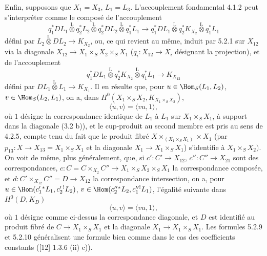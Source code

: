 Enfin, supposons que $X_1=X_3$, $L_1=L_3$. L'accouplement fondamental 4.1.2 peut s'interpréter comme le composé de l'accouplement
\begin{equation}
\tag{5.2.7}
q_1^*DL_1\overset{\mathrm{L}}{\otimes}q_2^*L_2\overset{\mathrm{L}}{\otimes}q_2^*DL_2\overset{\mathrm{L}}{\otimes}q_1^*L_1
\longrightarrow
q_1^*DL_1\overset{\mathrm{L}}{\otimes}q_2^*K_{X_2}\overset{\mathrm{L}}{\otimes}q_1^*L_1
\end{equation}
défini par $L_2\overset{\mathrm{L}}{\otimes}DL_2\to K_{X_2}$, ou, ce qui revient au même, induit par 5.2.1 sur $X_{12}$ via la diagonale $X_{12}\to X_1\times_SX_2\times_SX_1$ ($q_i:X_{12}\to X_i$ désignant la projection), et de l'accouplement
\begin{equation}
\tag{5.2.8}
q_1^*DL_1\overset{\mathrm{L}}{\otimes}q_2^*K_{X_2}\overset{\mathrm{L}}{\otimes}q_1^*L_1\longrightarrow K_{X_{12}}
\end{equation}
défini par $DL_1\overset{\mathrm{L}}{\otimes}L_1\to K_{X_1}$. Il en résulte que, pour $u\in\Hom_S(L_1,L_2)$, $v\in\Hom_S(L_2,L_1)$, on a, dans $H^0(X_1\times_SX_2,K_{X_1\times_SX_2})$,
\begin{equation}
\tag{5.2.9}
\langle u,v\rangle=\langle vu,1\rangle,
\end{equation}
où $1$ désigne la correspondance identique de $L_1$ à $L_1$ sur $X_1\times_SX_1$, à support dans la diagonale (3.2 b)), et le cup-produit au second membre est pris au sens de 4.2.5, compte tenu du fait que le produit fibré $X\times_{(X_1\times_SX_1)}\times X_1$ (par $p_{13}:X\to X_{13}=X_1\times_SX_1$ et la diagonale $X_1\to X_1\times_SX_1$) s'identifie à $X_1\times_SX_2)$. On voit de même, plus généralement, que, si $c':C'\to X_{12}$, $c'':C''\to X_{21}$
sont des correspondances, $c:C=C\times_{X_2}C''\to X_1\times_SX_2\times_SX_1$ la 
correspondance composée, et $d:C'\times_{X_{12}}C''=D\to X_{12}$ la correspondance intersection, on a, pour $u\in\Hom(c_1'{}^*L_1,c_2'{}^!L_2)$, $v\in\Hom(c_2''{}^*L_2,c_1''{}^!L_1)$, l'égalité suivante dans $H^0(D,K_D)$
\begin{equation}
\tag{5.2.10}
\langle u,v\rangle=\langle vu,1\rangle,
\end{equation}
où $1$ désigne comme ci-dessus la correspondance diagonale, et $D$ est identifié au produit fibré de $C\to X_1\times_SX_1$ et la diagonale $X_1\to X_1\times_SX_1$. Les formules 5.2.9 et 5.2.10 généralisent une formule bien comme dans le cas des coefficients constants ([12] 1.3.6 (ii) c)).

